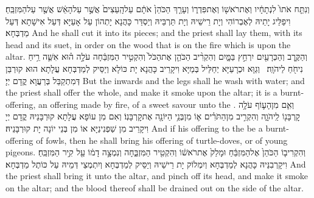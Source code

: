 {וְנִתַּ֤ח אֹתוֹ֙ לִנְתָחָ֔יו וְאֶת\maqqaf רֹאשׁ֖וֹ וְאֶת\maqqaf פִּדְר֑וֹ וְעָרַ֤ךְ הַכֹּהֵן֙ אֹתָ֔ם עַל\maqqaf הָֽעֵצִים֙ אֲשֶׁ֣ר עַל\maqqaf הָאֵ֔שׁ אֲשֶׁ֖ר עַל\maqqaf הַמִּזְבֵּֽחַ׃}
{וִיפַלֵּיג יָתֵיהּ לְאֶבְרוֹהִי וְיָת רֵישֵׁיהּ וְיָת תַּרְבֵּיהּ וְיַסְדַּר כָּהֲנָא יָתְהוֹן עַל אָעַיָּא דְּעַל אִישָׁתָא דְּעַל מַדְבְּחָא׃}
{And he shall cut it into its pieces; and the priest shall lay them, with its head and its suet, in order on the wood that is on the fire which is upon the altar.}{}
{וְהַקֶּ֥רֶב וְהַכְּרָעַ֖יִם יִרְחַ֣ץ בַּמָּ֑יִם וְהִקְרִ֨יב הַכֹּהֵ֤ן אֶת\maqqaf הַכֹּל֙ וְהִקְטִ֣יר הַמִּזְבֵּ֔חָה עֹלָ֣ה ה֗וּא אִשֵּׁ֛ה רֵ֥יחַ נִיחֹ֖חַ לַיהֹוָֽה׃ \petucha }
{וְגַוָּא וּכְרָעַיָּא יְחַלֵּיל בְּמַיָּא וִיקָרֵיב כָּהֲנָא יָת כּוֹלָא וְיַסֵּיק לְמַדְבְּחָא עֲלָתָא הוּא קוּרְבַּן דְּמִתְקַבַּל בְּרַעֲוָא קֳדָם יְיָ׃}
{But the inwards and the legs shall he wash with water; and the priest shall offer the whole, and make it smoke upon the altar; it is a burnt-offering, an offering made by fire, of a sweet savour unto the \lord.}{}
{וְאִ֧ם מִן\maqqaf הָע֛וֹף עֹלָ֥ה קׇרְבָּנ֖וֹ לַֽיהֹוָ֑ה וְהִקְרִ֣יב מִן\maqqaf הַתֹּרִ֗ים א֛וֹ מִן\maqqaf בְּנֵ֥י הַיּוֹנָ֖ה אֶת\maqqaf קׇרְבָּנֽוֹ׃}
{וְאִם מִן עוֹפָא עֲלָתָא קוּרְבָּנֵיהּ קֳדָם יְיָ וִיקָרֵיב מִן שַׁפְנִינַיָּא אוֹ מִן בְּנֵי יוֹנָה יָת קוּרְבָּנֵיהּ׃}
{And if his offering to the \lord\space be a burnt-offering of fowls, then he shall bring his offering of turtle-doves, or of young pigeons.}{}
{וְהִקְרִיב֤וֹ הַכֹּהֵן֙ אֶל\maqqaf הַמִּזְבֵּ֔חַ וּמָלַק֙ אֶת\maqqaf רֹאשׁ֔וֹ וְהִקְטִ֖יר הַמִּזְבֵּ֑חָה וְנִמְצָ֣ה דָמ֔וֹ עַ֖ל קִ֥יר הַמִּזְבֵּֽחַ׃}
{וִיקָרְבִנֵּיהּ כָּהֲנָא לְמַדְבְּחָא וְיִמְלוֹק יָת רֵישֵׁיהּ וְיַסֵּיק לְמַדְבְּחָא וְיִתְמְצֵי דְּמֵיהּ עַל כּוֹתֶל מַדְבְּחָא׃}
{And the priest shall bring it unto the altar, and pinch off its head, and make it smoke on the altar; and the blood thereof shall be drained out on the side of the altar.}{}
